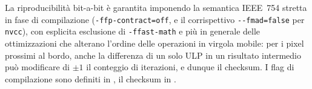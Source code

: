 La riproducibilità bit-a-bit è garantita imponendo la semantica
IEEE~754 stretta in fase di compilazione
(\texttt{-ffp-contract=off}, e il corrispettivo \texttt{-{}-fmad=false}
per \texttt{nvcc}), con esplicita esclusione di \texttt{-ffast-math} e
più in generale delle ottimizzazioni che alterano l'ordine delle
operazioni in virgola mobile: per i pixel prossimi al bordo, anche la
differenza di un solo ULP in un risultato intermedio può modificare di
$\pm 1$ il conteggio di iterazioni, e dunque il checksum. I flag di
compilazione sono definiti in , il
checksum in .
